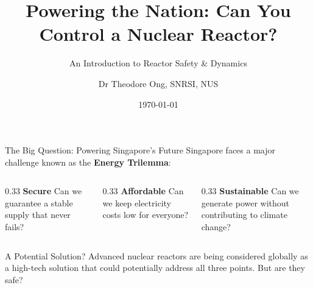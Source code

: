 \documentclass[aspectratio=169]{beamer}
\institute{Singapore Nuclear Research and Safety Institute}
\title[Controlling a Nuclear Reactor]{Powering the Nation: Can You Control a Nuclear Reactor?}
\subtitle{An Introduction to Reactor Safety \& Dynamics}
\author{Dr Theodore Ong, SNRSI, NUS}
\date{\today}
\begin{document}

\begin{frame}
	\titlepage
\end{frame}

\begin{frame}[allowframebreaks]{The Big Question: Powering Singapore's Future}
    Singapore faces a major challenge known as the \textbf{Energy Trilemma}:

    \vspace{1.5em}
    \begin{columns}[T]
        \begin{column}{0.33\textwidth}
            \centering
            \Large \textbf{Secure}
            \vspace{0.5em}
            \normalsize Can we guarantee a stable supply that never fails?
        \end{column}
        \begin{column}{0.33\textwidth}
            \centering
            \Large \textbf{Affordable}
            \vspace{0.5em}
            \normalsize Can we keep electricity costs low for everyone?
        \end{column}
        \begin{column}{0.33\textwidth}
            \centering
            \Large \textbf{Sustainable}
            \vspace{0.5em}
            \normalsize Can we generate power without contributing to climate change?
        \end{column}
    \end{columns}

    \vspace{2em}
    \begin{block}{A Potential Solution?}
        Advanced nuclear reactors are being considered globally as a high-tech solution that could potentially address all three points. But are they safe?
	\end{block}
\end{frame}
\end{document}
